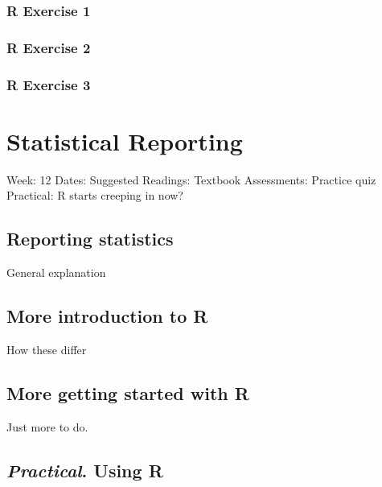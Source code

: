 \documentclass[
]{book}
\begin{document}
\hypertarget{r-exercise-1}{%
\section{R Exercise 1}\label{r-exercise-1}}

\hypertarget{r-exercise-2}{%
\section{R Exercise 2}\label{r-exercise-2}}

\hypertarget{r-exercise-3}{%
\section{R Exercise 3}\label{r-exercise-3}}

\hypertarget{part-statistical-reporting}{%
\part{Statistical Reporting}\label{part-statistical-reporting}}

Week: 12
Dates:
Suggested Readings: Textbook
Assessments: Practice quiz
Practical: R starts creeping in now?

\hypertarget{reporting-statistics}{%
\chapter{Reporting statistics}\label{reporting-statistics}}

General explanation

\hypertarget{more-introduction-to-r}{%
\chapter{More introduction to R}\label{more-introduction-to-r}}

How these differ

\hypertarget{more-getting-started-with-r}{%
\chapter{More getting started with R}\label{more-getting-started-with-r}}

Just more to do.

\hypertarget{practical.-using-r-1}{%
\chapter{\texorpdfstring{\emph{Practical}. Using R}{Practical. Using R}}\label{practical.-using-r-1}}
\end{document}
